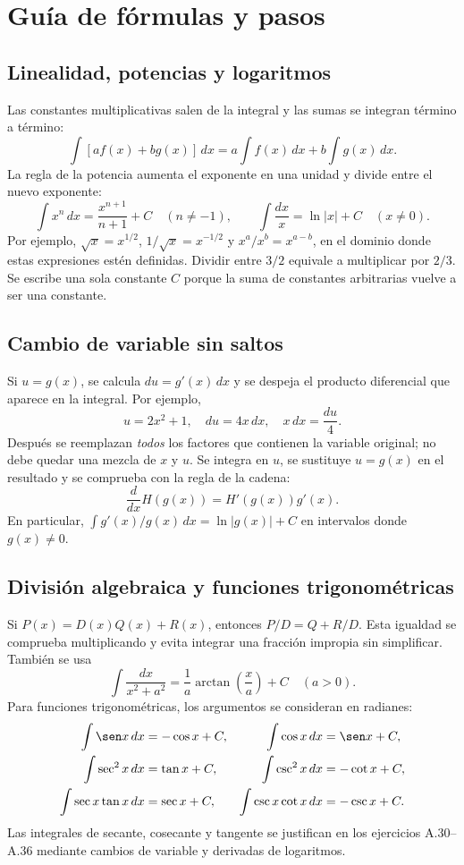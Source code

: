 \section{Guía de fórmulas y pasos}
\subsection{Linealidad, potencias y logaritmos}
Las constantes multiplicativas salen de la integral y las sumas se integran término a término:
\[
 \int [af(x)+bg(x)]\,dx=a\int f(x)\,dx+b\int g(x)\,dx.
\]
La regla de la potencia aumenta el exponente en una unidad y divide entre el nuevo exponente:
\[
 \int x^n\,dx=\frac{x^{n+1}}{n+1}+C\quad(n\ne-1),
 \qquad \int\frac{dx}{x}=\ln|x|+C\quad(x\ne0).
\]
Por ejemplo, $\sqrt{x}=x^{1/2}$, $1/\sqrt{x}=x^{-1/2}$ y $x^a/x^b=x^{a-b}$, en el dominio donde estas expresiones estén definidas. Dividir entre $3/2$ equivale a multiplicar por $2/3$. Se escribe una sola constante $C$ porque la suma de constantes arbitrarias vuelve a ser una constante.

\subsection{Cambio de variable sin saltos}
Si $u=g(x)$, se calcula $du=g'(x)\,dx$ y se despeja el producto diferencial que aparece en la integral. Por ejemplo,
\[
 u=2x^2+1,\quad du=4x\,dx,\quad x\,dx=\frac{du}{4}.
\]
Después se reemplazan \emph{todos} los factores que contienen la variable original; no debe quedar una mezcla de $x$ y $u$. Se integra en $u$, se sustituye $u=g(x)$ en el resultado y se comprueba con la regla de la cadena:
\[
 \frac{d}{dx}H(g(x))=H'(g(x))g'(x).
\]
En particular, $\int g'(x)/g(x)\,dx=\ln|g(x)|+C$ en intervalos donde $g(x)\ne0$.

\subsection{División algebraica y funciones trigonométricas}
Si $P(x)=D(x)Q(x)+R(x)$, entonces $P/D=Q+R/D$. Esta igualdad se comprueba multiplicando y evita integrar una fracción impropia sin simplificar. También se usa
\[
 \int\frac{dx}{x^2+a^2}=\frac1a\arctan\!\left(\frac xa\right)+C\quad(a>0).
\]
Para funciones trigonométricas, los argumentos se consideran en radianes:
\begin{align*}
 \int\sen x\,dx&=-\cos x+C,&\int\cos x\,dx&=\sen x+C,\\
 \int\sec^2x\,dx&=\tan x+C,&\int\csc^2x\,dx&=-\cot x+C,\\
 \int\sec x\tan x\,dx&=\sec x+C,&\int\csc x\cot x\,dx&=-\csc x+C.
\end{align*}
Las integrales de secante, cosecante y tangente se justifican en los ejercicios A.30--A.36 mediante cambios de variable y derivadas de logaritmos.


